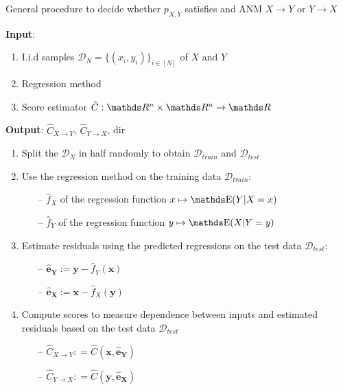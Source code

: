 \begin{algorithm}%

    \caption{General procedure to decide whether $p_{X, Y}$ satisfies and ANM $X \rightarrow Y$
        or $Y \rightarrow X$}
  
    \textbf{Input}:

    \begin{enumerate}
        \item I.i.d samples $\mathcal{D}_N = \{ (x_i, y_i )\}_{i \in [N]}$ of $X$ and $Y$
        \item Regression method
        \item Score estimator $\hat{C}: \R^n \times \R^n \rightarrow \R$
    \end{enumerate}
    
    \textbf{Output}: $\hat{C}_{X \rightarrow Y}$, $\hat{C}_{Y \rightarrow X}$, dir

    \begin{enumerate}

        \item Split the $\mathcal{D}_N$ in half randomly to obtain  $\mathcal{D}_{train}$ 
        and $\mathcal{D}_{test}$

        \item Use the regression method on the training data $\mathcal{D}_{train}$:
        \begin{itemize}
            \item[--] $\hat{f}_X$ of the regression function $x \mapsto \E(Y | X=x)$
            \item[--] $\hat{f}_Y$ of the regression function $y \mapsto \E(X | Y=y)$
        \end{itemize}

        \item Estimate residuals using the predicted regressions on the test data $\mathcal{D}_{test}$:
        \begin{itemize}
            \item[--] $ \mathbf{\hat{e}_Y} := \mathbf{y} - \hat{f}_Y(\mathbf{x})$
            \item[--] $ \mathbf{\hat{e}_X} := \mathbf{x} - \hat{f}_X(\mathbf{y})$
        \end{itemize}

        \item Compute scores to measure dependence between inputs and estimated residuals based on the
        test data $\mathcal{D}_{test}$
        \begin{itemize}
            \item[--] $\hat{C}_{X \rightarrow Y}: = \hat{C}(\mathbf{x}, \mathbf{\hat{e}_Y})$ 
            \item[--] $\hat{C}_{Y \rightarrow X}: = \hat{C}(\mathbf{y}, \mathbf{\hat{e}_X})$
        \end{itemize}        


\end{enumerate}
\end{algorithm}
